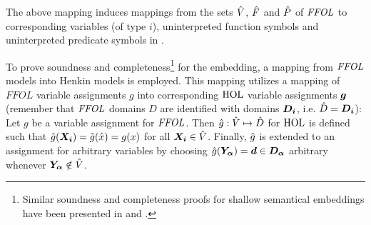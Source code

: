 The above mapping induces mappings from the sets $\hat{V}$, $\hat{F}$ and $\hat{P}$
of $\mathit{FFOL}$ to corresponding variables (of type $i$), uninterpreted function
symbols and uninterpreted predicate symbols in \HOL.

To prove soundness and completeness\footnote{Similar soundness and completeness proofs for
  shallow semantical embeddings have been presented in \cite{C37} and
  \cite{J31}.} for the embedding, a
mapping from $\mathit{FFOL}$ models into Henkin models is
employed.
This mapping utilizes a mapping of $FFOL$ variable
assignments $g$ into corresponding $\text{\textrm{HOL}}$ variable assignments
$\boldsymbol{g}$ (remember that $\mathit{FFOL}$  domains $D$ are  identified with 
\HOL domains $\boldsymbol{D_i}$, i.e. $\hat{D} = \boldsymbol{D_i}$): Let $g$ be a variable assignment for
  $\mathit{FFOL}$.  Then $\hat{g}:
  \hat{V}\mapsto \hat{D}$ for $\text{\textrm{HOL}}$ is defined such that
  $\hat{g}(\boldsymbol{X_i}) = \hat{g}(\hat{x}) = g(x)$ 
for all $\boldsymbol{X_i}\in \hat{V}$. 
Finally, $\hat{g}$ is extended to an assignment for arbitrary
variables by choosing
$\hat{g}(\boldsymbol{Y_\alpha}) = \boldsymbol{d}\in \boldsymbol{D_\alpha}$ arbitrary 
whenever $\boldsymbol{Y_\alpha} \notin \hat{V}$.

